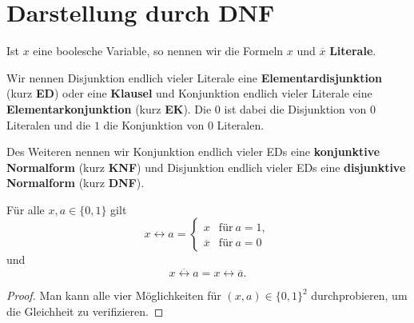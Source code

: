 \section{Darstellung durch DNF} 

\begin{defn}
	Ist $x$ eine boolesche Variable, so nennen wir die Formeln $x$ und $\overline{x}$ \textbf{Literale}. 
	
	Wir nennen Disjunktion endlich vieler Literale eine \textbf{Elementardisjunktion} (kurz \textbf{ED}) oder eine \textbf{Klausel} und Konjunktion endlich vieler Literale eine \textbf{Elementarkonjunktion} (kurz \textbf{EK}).  Die $0$ ist dabei die Disjunktion von $0$ Literalen und die $1$ die Konjunktion von $0$ Literalen. 
	
	Des Weiteren nennen wir Konjunktion endlich vieler EDs eine \textbf{konjunktive Normalform} (kurz \textbf{KNF}) und Disjunktion endlich vieler EDs eine \textbf{disjunktive Normalform} (kurz \textbf{DNF}). 
\end{defn} 


\begin{lem}
	Für alle $x, a \in \{0,1\}$ gilt
	\begin{equation} \label{equiv:x:no:x}
	x \leftrightarrow a = \begin{cases} 
		x & \text{für} \ a=1,
		\\				\overline{x} & \text{für} \ a=0
	\end{cases} 
	\end{equation}
	und 
	\begin{equation} \label{neg:equiv} 
		\overline{x \leftrightarrow a} = x \leftrightarrow \overline{a}. 
	\end{equation}
\end{lem} 
\begin{proof} 
	Man kann alle vier Möglichkeiten für $(x,a) \in \{0,1\}^2$ durchprobieren, um die Gleichheit zu verifizieren. 
\end{proof} 

